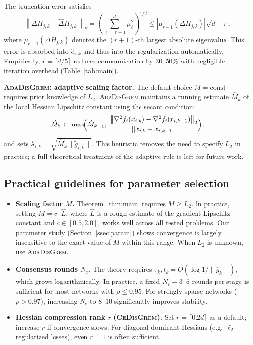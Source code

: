 \documentclass[11pt,a4paper]{article}
\def\cO{O}%
\def\norm#1{||#1||}%
\newcommand{\norm}[1]{\left\|#1\right\|}
\newcommand{\normtwo}[1]{\left\|#1\right\|_2}
\newcommand{\normF}[1]{\left\|#1\right\|_F}
\newcommand{\cO}{\mathcal{O}}
\begin{document}
The truncation error satisfies
\[
\normF{\Delta H_{j,k}-\hat\Delta H_{j,k}}
=\left(\sum_{\ell=r+1}^d \mu_\ell^2\right)^{1/2}
\le |\mu_{r+1}(\Delta H_{j,k})|\sqrt{d-r},
\]
where $\mu_{r+1}(\Delta H_{j,k})$ denotes the $(r+1)$-th largest absolute eigenvalue.
This error is absorbed into $\hat e_{i,k}$ and thus into the regularization automatically.
Empirically, $r=\lceil d/5\rceil$ reduces communication by 30--50\% with negligible iteration overhead
(Table~\ref{tab:main}).
	
	\noindent\textbf{\textsc{AdaDisGrem}: adaptive scaling factor.}
	The default choice $M=\mathrm{const}$ requires prior knowledge of $L_2$.
	\textsc{AdaDisGrem} maintains a running estimate $\hat M_k$ of the local Hessian Lipschitz
	constant using the secant condition:
	\[
	\hat M_k \gets \max\!\Bigl(\hat M_{k-1},\;
	\frac{\normtwo{\nabla^2 f_i(x_{i,k})-\nabla^2 f_i(x_{i,k-1})}}{\norm{x_{i,k}-x_{i,k-1}}}\Bigr),
	\]
	and sets $\lambda_{i,k}=\sqrt{\hat M_k\|\tilde g_{i,k}\|}$.
	This heuristic removes the need to specify $L_2$ in practice; a full theoretical treatment of the adaptive rule is left for future work.
	
	\subsection{Practical guidelines for parameter selection}\label{ssec:practical}
	
	\begin{itemize}[leftmargin=1.2em,itemsep=2pt]
		\item \textbf{Scaling factor $M$.}
		Theorem~\ref{thm:main} requires $M\ge L_2$.
		In practice, setting $M = c \cdot \hat L$, where $\hat L$ is a rough estimate of the
		gradient Lipschitz constant and $c\in[0.5, 2.0]$, works well across all tested problems.
		Our parameter study (Section~\ref{ssec:param}) shows convergence is largely insensitive
		to the exact value of $M$ within this range.
		When $L_2$ is unknown, use \textsc{AdaDisGrem}.
		\item \textbf{Consensus rounds $N_c$.}
		The theory requires $\tau_k, t_k = \cO(\log 1/\|\tilde{\bar g}_k\|)$, which grows
		logarithmically.  In practice, a fixed $N_c = 3$--$5$ rounds per stage is sufficient
		for most networks with $\rho \le 0.95$.
		For strongly sparse networks ($\rho > 0.97$), increasing $N_c$ to $8$--$10$
		significantly improves stability.
		\item \textbf{Hessian compression rank $r$ (\textsc{CeDisGrem}).}
		Set $r = \lceil 0.2d \rceil$ as a default; increase $r$ if convergence slows.
		For diagonal-dominant Hessians (e.g.\ $\ell_2$-regularized losses), even $r=1$
		is often sufficient.
	\end{itemize}
	
\end{document}
